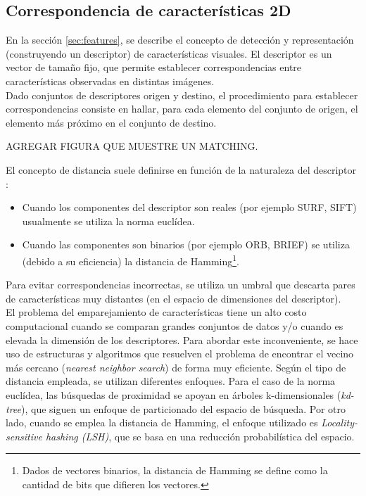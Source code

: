 \subsection{Correspondencia de características 2D}
En la sección \ref{sec:features}, se describe el concepto de detección y representación (construyendo un descriptor) de características visuales. El descriptor es un vector de tamaño fijo, que permite establecer correspondencias entre características observadas en distintas imágenes. \\
Dado conjuntos de descriptores origen y destino, el procedimiento para establecer correspondencias consiste en hallar, para cada elemento del conjunto de origen, el elemento más próximo en el conjunto de destino.

AGREGAR FIGURA QUE MUESTRE UN MATCHING.

El concepto de distancia suele definirse en función de la naturaleza del descriptor :
\begin{itemize}

\item Cuando los componentes del descriptor son reales (por ejemplo SURF, SIFT) usualmente se utiliza la norma euclídea.

\item Cuando las componentes son binarios (por ejemplo ORB, BRIEF) se utiliza (debido a su eficiencia) la distancia de Hamming\footnote{Dados de vectores binarios, la distancia de Hamming se define como la cantidad de bits que difieren los vectores.}.

\end{itemize}

Para evitar correspondencias incorrectas, se utiliza un umbral que descarta pares de características muy distantes (en el espacio de dimensiones del descriptor). \\

El problema del emparejamiento de características tiene un alto costo computacional cuando se comparan grandes conjuntos de datos y/o cuando es elevada la dimensión de los descriptores. Para abordar este inconveniente, se hace uso de estructuras y algoritmos que resuelven el problema de encontrar el vecino más cercano (\textit{nearest neighbor search}) de forma muy eficiente. Según el tipo de distancia empleada, se utilizan diferentes enfoques. Para el caso de la norma euclídea, las búsquedas de proximidad se apoyan en árboles k-dimensionales (\textit{kd-tree})\cite{wiki-kdtree}, que siguen un enfoque de particionado del espacio de búsqueda\cite{wiki-particionado-espacio}. Por otro lado, cuando se emplea la distancia de Hamming, el enfoque utilizado es \textit{Locality-sensitive hashing (LSH)}\cite{wiki-lsh}, que se basa en una reducción probabilística del espacio.


